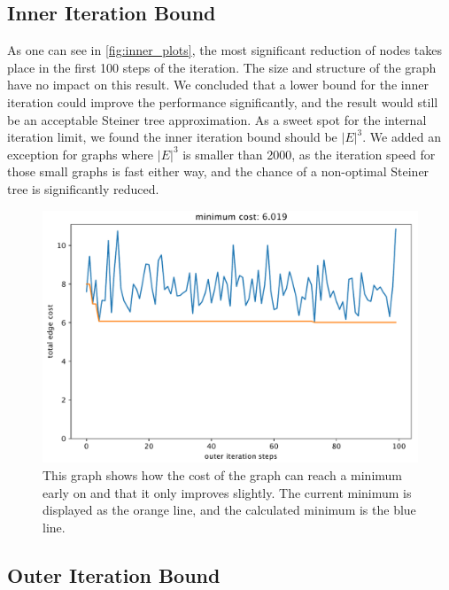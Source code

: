 \subsection{Inner Iteration Bound}
\label{sec:inner_iteration}

As one can see in \autoref{fig:inner_plots}, the most significant reduction of nodes takes place in the first 100 steps of the iteration. The size and structure of the graph have no impact on this result. We concluded that a lower bound for the inner iteration could improve the performance significantly, and the result would still be an acceptable Steiner tree approximation. As a sweet spot for the internal iteration limit, we found the inner iteration bound should be $|E|^{3}$. We added an exception for graphs where $|E|^{3}$ is smaller than 2000, as the iteration speed for those small graphs is fast either way, and the chance of a non-optimal Steiner tree is significantly reduced.

\begin{figure}[H]
  \centering
  \includegraphics[width=1\linewidth]{figures/outer_iteration.pdf}
  \caption{This graph shows how the cost of the graph can reach a minimum early on and that it only improves slightly. The current minimum is displayed as the orange line, and the calculated minimum is the blue line.}
  \label{fig:outer_plots}
\end{figure}

\subsection{Outer Iteration Bound}
\label{sec:outer_iteration}

